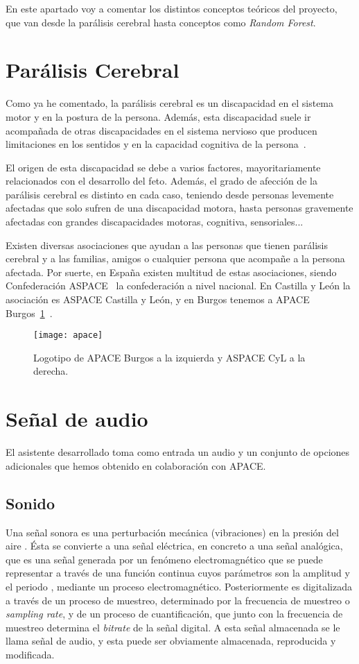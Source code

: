
En este apartado voy a comentar los distintos conceptos teóricos del proyecto, que van desde la parálisis cerebral hasta conceptos como \textit{Random Forest}.

\section{Parálisis Cerebral}
Como ya he comentado, la parálisis cerebral es un discapacidad en el sistema motor y en la postura de la persona. Además, esta discapacidad suele ir acompañada de otras discapacidades en el sistema nervioso que producen limitaciones en los sentidos y en la capacidad cognitiva de la persona~\cite{rosenbaum2007report,aspacecyl}.

El origen de esta discapacidad se debe a varios factores, mayoritariamente relacionados con el desarrollo del feto. Además, el grado de afección de la parálisis cerebral es distinto en cada caso, teniendo desde personas levemente afectadas que solo sufren de una discapacidad motora, hasta personas gravemente afectadas con grandes discapacidades motoras, cognitiva, sensoriales...

Existen diversas asociaciones que ayudan a las personas que tienen parálisis cerebral y a las familias, amigos o cualquier persona que acompañe a la persona afectada. Por suerte, en España existen multitud de estas asociaciones, siendo Confederación ASPACE~\cite{aspace} la confederación a nivel nacional. En Castilla y León la asociación es ASPACE Castilla y León, y en Burgos tenemos a APACE Burgos~\ref{fig:apace}~\cite{apace}.
\begin{figure}
	\centering
	\texttt{[image: apace]}
	\caption{Logotipo de APACE Burgos a la izquierda y ASPACE CyL a la derecha.}
	\label{fig:apace}
\end{figure}
\section{Señal de audio}
El asistente desarrollado toma como entrada un audio y un conjunto de opciones adicionales que hemos obtenido en colaboración con APACE.
\subsection{Sonido}
Una señal sonora es una  perturbación mecánica (vibraciones) en la presión del aire \cite{pierce1995senales}. Ésta se convierte a una señal eléctrica, en concreto a una señal analógica, que es una señal generada por un fenómeno electromagnético que se puede representar a través de una función continua cuyos parámetros son la amplitud y el periodo \cite{analogica}, mediante un proceso electromagnético. Posteriormente es digitalizada a través de un proceso de muestreo, determinado por la frecuencia de muestreo o \textit{sampling rate}, y de un proceso de cuantificación, que junto con la frecuencia de muestreo determina el \textit{bitrate} de la señal digital. A esta señal almacenada se le llama señal de audio, y esta puede ser obviamente almacenada, reproducida y modificada.
